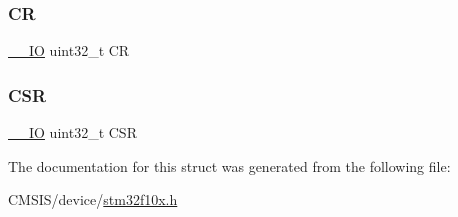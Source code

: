 \mbox{\label{struct_r_c_c___type_def_ab40c89c59391aaa9d9a8ec011dd0907a}} 
\subsubsection{\texorpdfstring{CR}{CR}}
{\footnotesize\ttfamily \mbox{\hyperlink{core__sc300_8h_aec43007d9998a0a0e01faede4133d6be}{\+\_\+\+\_\+\+IO}} uint32\+\_\+t CR}

\mbox{\label{struct_r_c_c___type_def_a876dd0a8546697065f406b7543e27af2}} 
\subsubsection{\texorpdfstring{CSR}{CSR}}
{\footnotesize\ttfamily \mbox{\hyperlink{core__sc300_8h_aec43007d9998a0a0e01faede4133d6be}{\+\_\+\+\_\+\+IO}} uint32\+\_\+t C\+SR}



The documentation for this struct was generated from the following file\+:\begin{DoxyCompactItemize}
\item 
C\+M\+S\+I\+S/device/\mbox{\hyperlink{stm32f10x_8h}{stm32f10x.\+h}}\end{DoxyCompactItemize}
